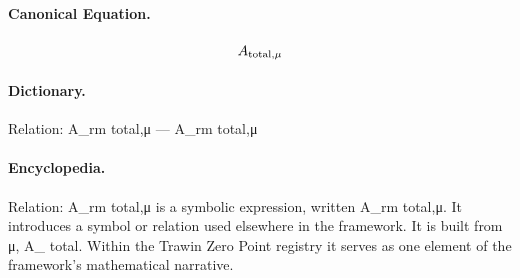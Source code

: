 \paragraph{Canonical Equation.}
\[
A_{\rm total,\mu}
\]

\paragraph{Dictionary.}
Relation: A\_rm total,μ — A\_rm total,μ

\paragraph{Encyclopedia.}
Relation: A\_rm total,μ is a symbolic expression, written A\_rm total,μ. It introduces a symbol or relation used elsewhere in the framework. It is built from μ, A\_ total. Within the Trawin Zero Point registry it serves as one element of the framework's mathematical narrative.
